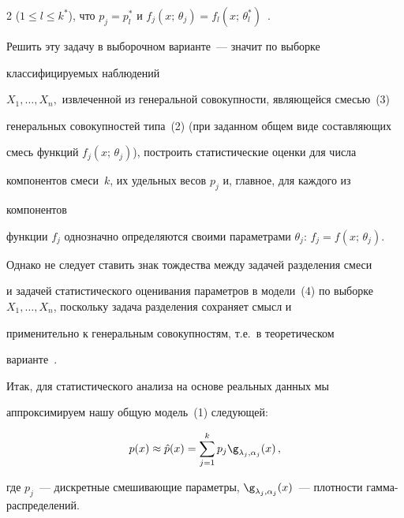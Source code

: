 \begin{multicols}{2}
($1\leq l \leq k^*$), что $p_j = p_l^*$ и $f_j (x;\,\theta_j ) = f_l 


(x;\,\theta_l^* )$~\cite{3bat}.





Решить эту задачу в выборочном варианте~--- значит по выборке


классифицируемых наблюдений


$X_1,\ldots , X_n, $ извлеченной из генеральной совокупности, яв\-ля\-ющей\-ся смесью~(3)


генеральных совокупностей типа~(2) (при заданном общем виде составляющих


смесь функций $f_j (x;\,\theta_j )$), построить статистические оценки для числа


компонентов смеси~$k$, их удельных весов $p_j$ и, главное, для каждого из


компонентов %


функции $f_j$ однозначно определяются своими параметрами $\theta_j$: $f_j


=f(x;\,\theta_j)$.





Однако не следует ставить знак тождества между задачей разделения смеси


и задачей статистического оценивания параметров в модели~(4) по выборке $


X_1,\ldots , X_n$, поскольку задача разделения сохраняет смысл и


применительно к генеральным совокупностям, т.е.\ в теоретическом


варианте~\cite{3bat}.





Итак, для статистического анализа на основе реальных данных мы


аппроксимируем нашу общую модель~(1) следующей:


$$


p(x) \approx \hat{p}(x) = \sum\limits_{j=1}^k p_j \g_{\lambda_j , \alpha_j}


(x)\,,


$$


где $p_j$~--- дискретные смешивающие параметры, $\g_{\lambda_j , \alpha_j}


(x)$~--- плотности гамма-распределений.






\end{multicols}
